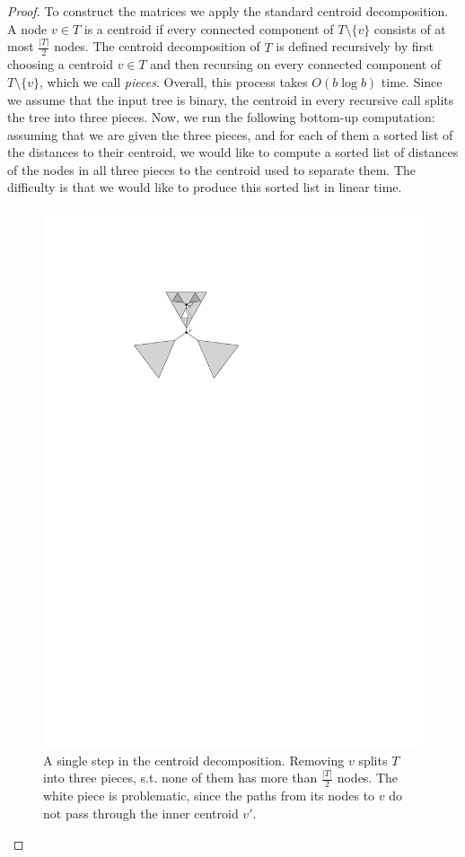 \documentclass[11pt,a4paper]{article}
\theoremstyle{definition}
\theoremstyle{remark}
\begin{document}
\begin{proof}
To construct the matrices we apply the standard centroid decomposition. A node $v\in T$ is a centroid if every connected component of
$T\setminus\{v\}$ consists of at most $\frac{|T|}{2}$ nodes. The centroid decomposition of $T$ is defined recursively by first choosing a centroid
$v\in T$ and then recursing on every connected component of $T\setminus\{v\}$, which we call \emph{pieces}.
Overall, this process takes $O(b\log b)$ time. Since we assume that the input tree is binary, the centroid in every recursive call splits the tree
into three pieces. Now, we run the following bottom-up computation: assuming that we are given the three pieces, and for each of
them a sorted list of the distances to their centroid, we would like to compute a sorted list of distances of the nodes in all three pieces
to the centroid used to separate them. The difficulty is that we would like to produce this sorted list in linear time.


\begin{figure}[ht]
\begin{center}
\includegraphics[scale=1]{centroid}
\end{center}
\caption{A single step in the centroid decomposition. Removing $v$ splits $T$ into three pieces, s.t. none of them has more than $\frac{|T|}{2}$ nodes. The white piece is problematic, since the paths from its nodes to $v$ do not pass through the inner centroid $v'$. \label{fig:problematic}}
\end{figure}



\end{proof}
\end{document}
